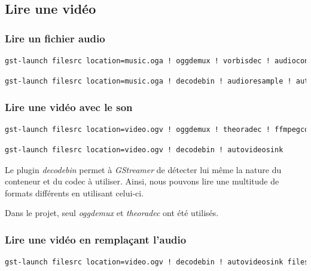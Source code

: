 \documentclass[a4paper, 11pt]{article}
\begin{document}
	\subsection{Lire une vidéo}
	\subsubsection{Lire un fichier audio}
	\begin{lstlisting}[numbers=none,language=sh, caption=Lire un fichier audio -- Uniquement pour les fichier \texttt{.oga}]
gst-launch filesrc location=music.oga ! oggdemux ! vorbisdec ! audioconvert ! alsasink
	\end{lstlisting}
	\begin{lstlisting}[numbers=none,language=sh, caption=Lire un fichier audio -- Pour tous les formats audio]
gst-launch filesrc location=music.oga ! decodebin ! audioresample ! autoaudiosink
	\end{lstlisting}
	\subsubsection{Lire une vidéo avec le son}
	\begin{lstlisting}[numbers=none,language=sh, caption=Lire une vidéo -- Uniquement pour les fichier \texttt{.ogv}]
gst-launch filesrc location=video.ogv ! oggdemux ! theoradec ! ffmpegcolorspace ! autovideosink
	\end{lstlisting}
	\begin{lstlisting}[numbers=none,language=sh, caption=Lire une vidéo -- Pour tous les formats audio-vidéos]
gst-launch filesrc location=video.ogv ! decodebin ! autovideosink
	\end{lstlisting}
	\begin{remarque}
		Le plugin \textit{decodebin} permet à \textit{GStreamer} de détecter lui même la nature du conteneur et du codec à utiliser. Ainsi, nous pouvons lire une multitude de
		formats différents en utilisant celui-ci.

		Dans le projet, seul \textit{oggdemux} et \textit{theoradec} ont été utilisés.
	\end{remarque}
	\subsubsection{Lire une vidéo en remplaçant l'audio}
	\begin{lstlisting}[language=sh, caption=Lire une vidéo avec le son de source différente]
gst-launch filesrc location=video.ogv ! decodebin ! autovideosink filesrc location=Thunderstruck.ogg ! decodebin ! autoaudiosink
	\end{lstlisting}
\end{document}
